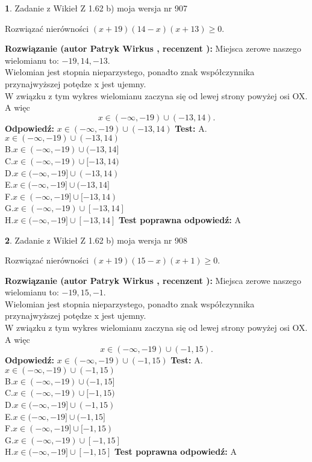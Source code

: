 \documentclass[12pt, a4paper]{article}
\theoremstyle{definition} %
\newtheorem{zad}{}
\newcommand{\zadStart}[1]{\begin{zad}#1\newline}
\newcommand{\zadStop}{\end{zad}}
\newcommand{\rozwStart}[2]{\noindent \textbf{Rozwiązanie (autor #1 , recenzent #2): }\newline}
\newcommand{\rozwStop}{\newline}
\newcommand{\odpStart}{\noindent \textbf{Odpowiedź:}\newline}
\newcommand{\odpStop}{\newline}
\newcommand{\testStart}{\noindent \textbf{Test:}\newline}
\newcommand{\testStop}{\newline}
\newcommand{\kluczStart}{\noindent \textbf{Test poprawna odpowiedź:}\newline}
\newcommand{\kluczStop}{\newline}
\begin{document}
\zadStart{Zadanie z Wikieł Z 1.62 b) moja wersja nr 907}

Rozwiązać nierówności $(x+19)(14-x)(x+13)\ge0$.
\zadStop
\rozwStart{Patryk Wirkus}{}
Miejsca zerowe naszego wielomianu to: $-19, 14, -13$.\\
Wielomian jest stopnia nieparzystego, ponadto znak współczynnika przy\linebreak najwyższej potędze x jest ujemny.\\ W związku z tym wykres wielomianu zaczyna się od lewej strony powyżej osi OX. A więc $$x \in (-\infty,-19) \cup (-13,14).$$
\rozwStop
\odpStart
$x \in (-\infty,-19) \cup (-13,14)$
\odpStop
\testStart
A.$x \in (-\infty,-19) \cup (-13,14)$\\
B.$x \in (-\infty,-19) \cup (-13,14]$\\
C.$x \in (-\infty,-19) \cup [-13,14)$\\
D.$x \in (-\infty,-19] \cup (-13,14)$\\
E.$x \in (-\infty,-19] \cup (-13,14]$\\
F.$x \in (-\infty,-19] \cup [-13,14)$\\
G.$x \in (-\infty,-19) \cup [-13,14]$\\
H.$x \in (-\infty,-19] \cup [-13,14]$
\testStop
\kluczStart
A
\kluczStop



\zadStart{Zadanie z Wikieł Z 1.62 b) moja wersja nr 908}

Rozwiązać nierówności $(x+19)(15-x)(x+1)\ge0$.
\zadStop
\rozwStart{Patryk Wirkus}{}
Miejsca zerowe naszego wielomianu to: $-19, 15, -1$.\\
Wielomian jest stopnia nieparzystego, ponadto znak współczynnika przy\linebreak najwyższej potędze x jest ujemny.\\ W związku z tym wykres wielomianu zaczyna się od lewej strony powyżej osi OX. A więc $$x \in (-\infty,-19) \cup (-1,15).$$
\rozwStop
\odpStart
$x \in (-\infty,-19) \cup (-1,15)$
\odpStop
\testStart
A.$x \in (-\infty,-19) \cup (-1,15)$\\
B.$x \in (-\infty,-19) \cup (-1,15]$\\
C.$x \in (-\infty,-19) \cup [-1,15)$\\
D.$x \in (-\infty,-19] \cup (-1,15)$\\
E.$x \in (-\infty,-19] \cup (-1,15]$\\
F.$x \in (-\infty,-19] \cup [-1,15)$\\
G.$x \in (-\infty,-19) \cup [-1,15]$\\
H.$x \in (-\infty,-19] \cup [-1,15]$
\testStop
\kluczStart
A
\kluczStop
\end{document}
